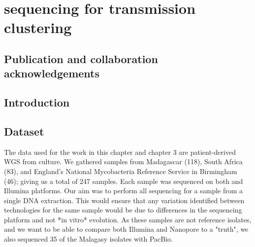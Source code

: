 
\chapter{\ont{} sequencing for \mtb{} transmission clustering}

\ifpdf
    \graphicspath{{Chapter2/Figs/Raster/}{Chapter2/Figs/PDF/}{Chapter2/Figs/}}
\else
    \graphicspath{{Chapter2/Figs/Vector/}{Chapter2/Figs/}}
\fi



\section*{Publication and collaboration acknowledgements}


\section{Introduction}


\section{Dataset}


The data used for the work in this chapter and chapter 3 are patient-derived \mtb{} WGS from culture. We gathered samples from Madagascar (118), South Africa (83), and England's National Mycobacteria Reference Service in Birmingham (46); giving us a total of 247 samples.  
Each sample was sequenced on both \ont{} and Illumina platforms. Our aim was to perform all sequencing for a sample from a single DNA extraction. This would ensure that any variation identified between technologies for the same sample would be due to differences in the sequencing platform and not *in vitro* evolution.  
As these samples are not reference isolates, and we want to be able to compare both Illumina and Nanopore to a "truth", we also sequenced 35 of the Malagasy isolates with PacBio.


